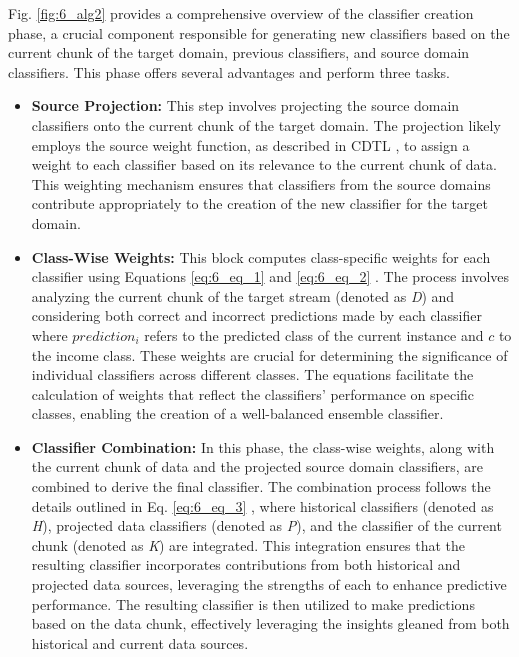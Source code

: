 Fig. \ref{fig:6_alg2} provides a comprehensive overview of the classifier creation phase, a crucial component responsible for generating new classifiers based on the current chunk of the target domain, previous classifiers, and source domain classifiers. This phase offers several advantages and perform three tasks. \begin{itemize}
	\item \textbf{Source Projection:} This step involves projecting the source domain classifiers onto the current chunk of the target domain. The projection likely employs the source weight function, as described in CDTL \cite{yang2021concept}, to assign a weight to each classifier based on its relevance to the current chunk of data. This weighting mechanism ensures that classifiers from the source domains contribute appropriately to the creation of the new classifier for the target domain.
	\item \textbf{Class-Wise Weights:} This block computes class-specific weights for each classifier using Equations \ref{eq:6_eq_1} and \ref{eq:6_eq_2} . The process involves analyzing the current chunk of the target stream (denoted as \emph{D}) and considering both correct and incorrect predictions made by each classifier where $prediction_i$ refers to the predicted class of the current instance and $c$ to the income class. These weights are crucial for determining the significance of individual classifiers across different classes. The equations facilitate the calculation of weights that reflect the classifiers' performance on specific classes, enabling the creation of a well-balanced ensemble classifier.
	\item \textbf{Classifier Combination:} In this phase, the class-wise weights, along with the current chunk of data and the projected source domain classifiers, are combined to derive the final classifier. The combination process follows the details outlined in Eq. \ref{eq:6_eq_3} , where historical classifiers (denoted as \emph{H}), projected data classifiers (denoted as \emph{P}), and the classifier of the current chunk (denoted as \emph{K}) are integrated. This integration ensures that the resulting classifier incorporates contributions from both historical and projected data sources, leveraging the strengths of each to enhance predictive performance. The resulting classifier is then utilized to make predictions based on the data chunk, effectively leveraging the insights gleaned from both historical and current data sources.
\end{itemize}

